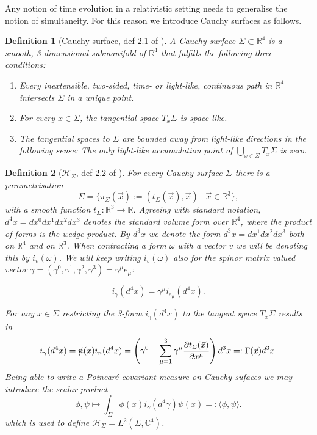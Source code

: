 \documentclass[b5paper,draft,openbib,12pt]{memoir}
\newtheorem{Def}{Definition}
\begin{document}
Any notion of time evolution in a relativistic setting needs to 
generalise the notion of simultaneity. For this reason we 
introduce Cauchy surfaces as follows.


\begin{Def}[Cauchy surface, def 2.1 of \cite{deckert2016perspective}]
  A Cauchy surface \(\Sigma\subset \mathbb{R}^4\) is a smooth, 
  3-dimensional submanifold of \(\mathbb{R}^4\) that fulfills
  the following three conditions:
  \begin{enumerate}[label=\alph*)]
  \item Every inextensible, two-sided, time- or light-like, continuous path in \(\mathbb{R}^4\) intersects \(\Sigma\) in a unique point.
  \item For every \(x\in\Sigma\), the tangential space \(T_x\Sigma\) is space-like.
  \item The tangential spaces to \(\Sigma\) are bounded away from light-like directions in the following sense: The only light-like accumulation point of 
  \(\bigcup_{x\in \Sigma} T_x \Sigma\) is zero.
  \end{enumerate}
\end{Def}

\begin{Def}[\(\mathcal{H}_\Sigma\), def 2.2 of \cite{deckert2016perspective}]
For every Cauchy surface \(\Sigma\) there is a parametrisation
\begin{equation}
\Sigma= \{ \pi_\Sigma(\vec{x}):=(t_\Sigma(\vec{x}),\vec{x})\mid \vec{x}\in\mathbb{R}^3\},
\end{equation}
with a smooth function 
\(t_\Sigma: \mathbb{R}^3\rightarrow \mathbb{R}\). 
Agreeing with standard notation, 
\(d^4x=dx^0dx^1dx^2dx^3\) denotes the standard volume form over 
\(\mathbb{R}^4\),
where the product of forms is 
the wedge product. By \(d^3x\) we denote 
the form \(d^3x=dx^1dx^2dx^3\) both on \(\mathbb{R}^4\) and 
on \(\mathbb{R}^3\). When contracting a form 
\(\omega\) with a vector \(v\) we 
will be denoting this by \(i_v(\omega)\). 
We will keep writing \(i_v(\omega)\) 
also for the spinor matrix valued 
vector \(\gamma= (\gamma^0,\gamma^1,\gamma^2,\gamma^3)
=\gamma^\mu e_\mu\):

\begin{equation}
i_\gamma(d^4x)=\gamma^\mu i_{e_\mu}(d^4x).
\end{equation}

For any \(x\in \Sigma\) restricting the 
3-form \(i_\gamma(d^4x)\) to the tangent space 
\(T_x\Sigma\) results in 
\begin{equation}
i_\gamma(d^4x)=\slashed{n}(x)i_n(d^4x)
= \left(\gamma^0-\sum_{\mu=1}^3 \gamma^\mu 
\frac{\partial t_\Sigma (\vec{x})}{\partial x^\mu}\right) d^3x
=:\Gamma(\vec{x})d^3x.
\end{equation}
Being able to write a Poincaré covariant measure on Cauchy sufaces we 
may introduce the scalar product 
\begin{equation}
  \phi,\psi \mapsto \int_{\Sigma} \overline{\phi}(x) i_{\gamma}(d^4\gamma) \psi(x)
  =:\langle \phi,\psi\rangle.
\end{equation}
which is used to define 
\(\mathcal{H}_{\Sigma}=L^2(\Sigma, \mathbb{C}^4)\).
\end{Def}
\end{document}
